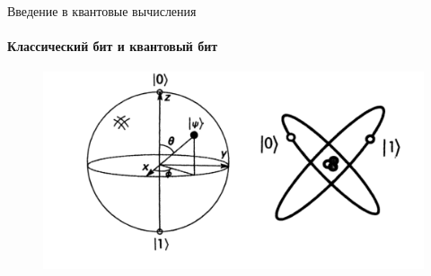 \documentclass{beamer}
\begin{document}
    \begin{frame}{Введение в квантовые вычисления}
    \framesubtitle{Классический бит и квантовый бит}

    \begin{figure}[]
    	\includegraphics[width=\linewidth]{media/qubits.pdf}
    \end{figure}
    
	\end{frame}
\end{document}
